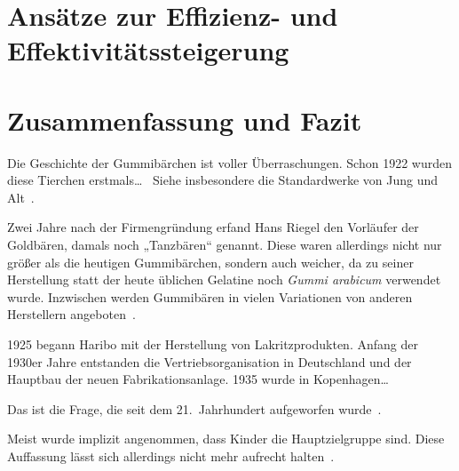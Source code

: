 \documentclass[ngerman]{seminarbeitrag} %
\begin{document}
\section{Ansätze zur Effizienz- und Effektivitätssteigerung}
\section{Zusammenfassung und Fazit}
\newpage


Die Geschichte der Gummi\-bär\-chen ist voller                       %
Über\-raschun\-gen. Schon 1922 wurden diese Tierchen erstmals\ldots\ %
Siehe insbesondere die Standardwerke von Jung und Alt~\cite{DEMO9999,DEMO9999}.

Zwei Jahre nach der Firmengründung erfand
Hans Riegel den Vorläufer der Goldbären, damals noch „Tanz\-bären“ genannt.
Diese waren allerdings nicht nur größer als die heutigen Gummibärchen,
sondern auch weicher, da zu seiner Herstellung statt der heute üblichen
Gelatine noch \emph{Gummi arabicum} verwendet wurde.
Inzwischen werden Gummibären in vielen Variationen von anderen Herstellern angeboten~\cite{DEMO9999}.

1925 begann Haribo mit der Herstellung von Lakritz\-produkten.
Anfang der 1930er Jahre entstanden die Vertriebsorganisation in Deutschland
und der Hauptbau der neuen Fabrikationsanlage. 1935 wurde in Kopenhagen\ldots


Das ist die Frage, die seit dem
21.~Jahrhundert aufgeworfen wurde~\cite[S.~237f]{DEMO9999}.

Meist wurde implizit angenommen, dass Kinder die Hauptzielgruppe sind.
Diese Auffassung lässt sich allerdings nicht mehr aufrecht halten~\cite{DEMO9999}.
\end{document}
